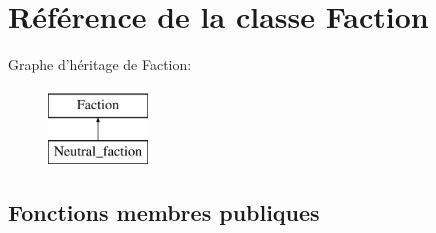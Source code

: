 \hypertarget{classFaction}{\section{Référence de la classe Faction}
\label{classFaction}
}
Graphe d'héritage de Faction\-:\begin{figure}[H]
\begin{center}
\leavevmode
\includegraphics[height=2.000000cm]{classFaction}
\end{center}
\end{figure}
\subsection*{Fonctions membres publiques}
